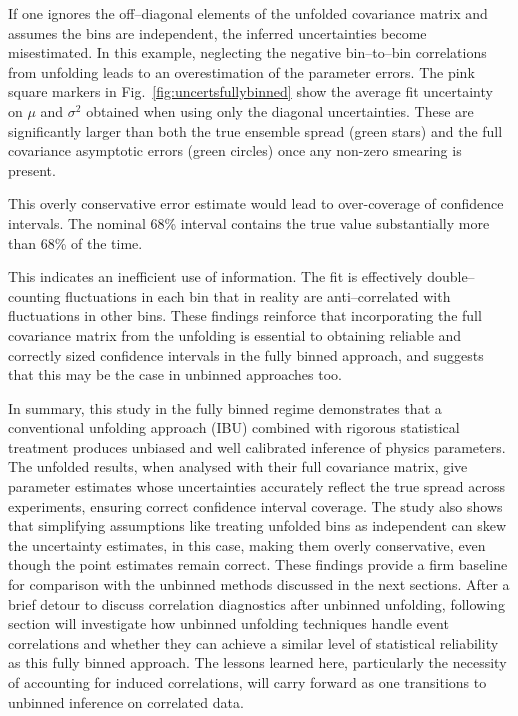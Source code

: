             If one ignores the off--diagonal elements of the unfolded covariance matrix and assumes the bins are independent, the inferred uncertainties become misestimated.
            In this example, neglecting the negative bin--to--bin correlations from unfolding leads to an overestimation of the parameter errors.
            The pink square markers in Fig.~\ref{fig:uncertsfullybinned} show the average fit uncertainty on $\mu$ and $\sigma^2$ obtained when using only the diagonal uncertainties.
            These are significantly larger than both the true ensemble spread (green stars) and the full covariance asymptotic errors (green circles) once any non-zero smearing is present.

            This overly conservative error estimate would lead to over-coverage of confidence intervals.
            The nominal 68\% interval contains the true value substantially more than 68\% of the time.
            
            This indicates an inefficient use of information.
            The fit is effectively double--counting fluctuations in each bin that in reality are anti--correlated with fluctuations in other bins.
            These findings reinforce that incorporating the full covariance matrix from the unfolding is essential to obtaining reliable and correctly sized confidence intervals in the fully binned approach, and suggests that this may be the case in unbinned approaches too.
            
        In summary, this study in the fully binned regime demonstrates that a conventional unfolding approach (IBU) combined with rigorous statistical treatment produces unbiased and well calibrated inference of physics parameters.
        The unfolded results, when analysed with their full covariance matrix, give parameter estimates whose uncertainties accurately reflect the true spread across experiments, ensuring correct confidence interval coverage.
        The study also shows that simplifying assumptions like treating unfolded bins as independent can skew the uncertainty estimates, in this case, making them overly conservative, even though the point estimates remain correct.
        These findings provide a firm baseline for comparison with the unbinned methods discussed in the next sections.
        After a brief detour to discuss correlation diagnostics after unbinned unfolding, following section will investigate how unbinned unfolding techniques handle event correlations and whether they can achieve a similar level of statistical reliability as this fully binned approach.
        The lessons learned here, particularly the necessity of accounting for induced correlations, will carry forward as one transitions to unbinned inference on correlated data.
        
